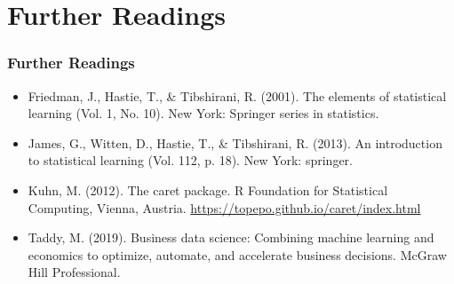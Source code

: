 \documentclass[
  shownotes,
  xcolor={svgnames},
  hyperref={colorlinks,citecolor=DarkBlue,linkcolor=DarkRed,urlcolor=DarkBlue}
  ]{beamer}
\begin{document}
\section{Further Readings}
\begin{frame}
\frametitle{Further Readings}

\begin{itemize}


  \item Friedman, J., Hastie, T., \& Tibshirani, R. (2001). The elements of statistical learning (Vol. 1, No. 10). New York: Springer series in statistics.
  \medskip
  \item James, G., Witten, D., Hastie, T., \& Tibshirani, R. (2013). An introduction to statistical learning (Vol. 112, p. 18). New York: springer.
  \medskip
  \item Kuhn, M. (2012). The caret package. R Foundation for Statistical Computing, Vienna, Austria. \url{https://topepo.github.io/caret/index.html}
  \medskip
  \item Taddy, M. (2019). Business data science: Combining machine learning and economics to optimize, automate, and accelerate business decisions. McGraw Hill Professional.

  
\end{itemize}

\end{frame}






\end{document}
